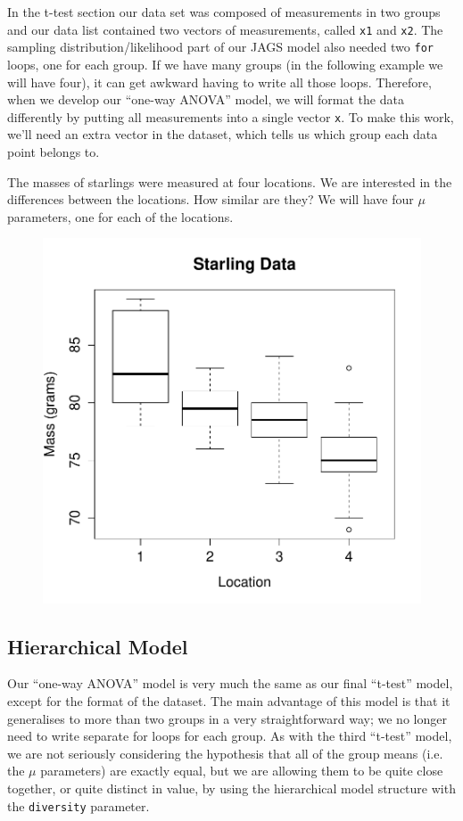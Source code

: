 In the t-test section our data set was composed of measurements in two groups
and our data list contained two vectors of measurements, called {\tt x1} and
{\tt x2}. The sampling distribution/likelihood part of our JAGS model also
needed two {\tt for} loops, one for each group.
If we have many groups (in the following example we will have four),
it can get awkward having to write all those loops. Therefore, when we develop
our ``one-way ANOVA'' model, we will format the data differently by putting
all measurements into a single vector {\tt x}. To make this work, we'll need
an extra vector in the dataset, which tells us which group each data point
belongs to.

The masses of starlings were measured at four locations. We are interested
in the differences between the locations. How similar are they? We will have
four $\mu$ parameters, one for each of the locations.

\begin{figure}[!ht]
\begin{center}
\includegraphics[scale=0.6]{Figures/starling.pdf}
\end{center}
\end{figure}


\subsection{Hierarchical Model}
Our ``one-way ANOVA'' model is very much the same as our final ``t-test'' model,
except for the format of the dataset.
The main advantage of this model is that it generalises to more than two groups
in a very straightforward way; we no longer need to write separate for loops
for each group. As with the third ``t-test'' model, we are not seriously
considering the hypothesis that all of the group means (i.e. the $\mu$
parameters) are exactly equal, but we are allowing them to be quite close
together, or quite distinct in value, by using the hierarchical model
structure with the {\tt diversity} parameter.

